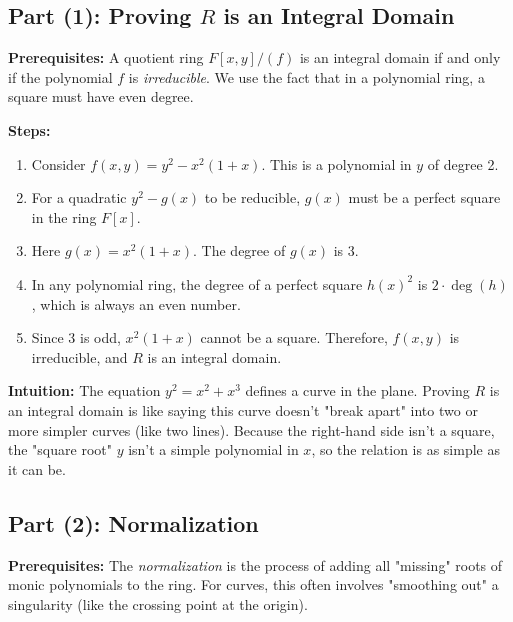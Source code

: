 \begin{solution}
\subsection*{Part (1): Proving $R$ is an Integral Domain}

\textbf{Prerequisites:} 
A quotient ring $F[x,y]/(f)$ is an integral domain if and only if the polynomial $f$ is \textit{irreducible}. We use the fact that in a polynomial ring, a square must have even degree.

\textbf{Steps:}
\begin{enumerate}
    \item Consider $f(x, y) = y^2 - x^2(1+x)$. This is a polynomial in $y$ of degree 2.
    \item For a quadratic $y^2 - g(x)$ to be reducible, $g(x)$ must be a perfect square in the ring $F[x]$.
    \item Here $g(x) = x^2(1+x)$. The degree of $g(x)$ is 3.
    \item In any polynomial ring, the degree of a perfect square $h(x)^2$ is $2 \cdot \deg(h)$, which is always an even number.
    \item Since 3 is odd, $x^2(1+x)$ cannot be a square. Therefore, $f(x, y)$ is irreducible, and $R$ is an integral domain.
\end{enumerate}

\textbf{Intuition:}
The equation $y^2 = x^2 + x^3$ defines a curve in the plane. Proving $R$ is an integral domain is like saying this curve doesn't "break apart" into two or more simpler curves (like two lines). Because the right-hand side isn't a square, the "square root" $y$ isn't a simple polynomial in $x$, so the relation is as simple as it can be.

\par\vspace{1.5em}

\subsection*{Part (2): Normalization}

\textbf{Prerequisites:} 
The \textit{normalization} is the process of adding all "missing" roots of monic polynomials to the ring. For curves, this often involves "smoothing out" a singularity (like the crossing point at the origin).


\end{solution}
